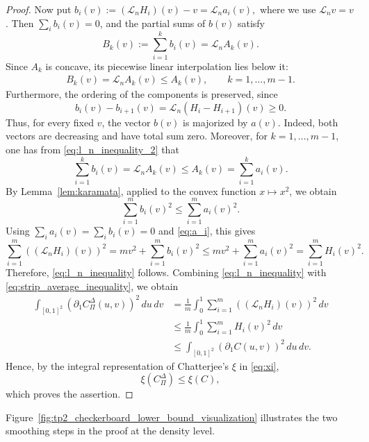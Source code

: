 \documentclass{article}
\theoremstyle{definition}
\begin{document}
\begin{proof}
    Now put
    \(
        b_i(v):=(\mathcal L_nH_i)(v)-v
        =
        \mathcal L_n a_i(v),
    \)
    where we use \(\mathcal L_n v=v\).
    Then \(\sum_i b_i(v)=0\), and the partial sums of \(b(v)\) satisfy
    \[
        B_k(v):=\sum_{i=1}^k b_i(v)
        =
        \mathcal L_n A_k(v).
    \]
    Since \(A_k\) is concave, its piecewise linear interpolation lies below it:
    \begin{align}\label{eq:l_n_inequality_2}
        B_k(v)=\mathcal L_n A_k(v)\le A_k(v),
        \qquad k=1,\dots,m-1.
    \end{align}
    Furthermore, the ordering of the components is preserved, since
    \[
        b_i(v)-b_{i+1}(v)
        =
        \mathcal L_n(H_i-H_{i+1})(v)\ge0.
    \]
    Thus, for every fixed \(v\), the vector \(b(v)\) is majorized by \(a(v)\).
    Indeed, both vectors are decreasing and have total sum zero.
    Moreover, for \(k=1,\ldots,m-1\), one has from \eqref{eq:l_n_inequality_2} that
    \[
        \sum_{i=1}^k b_i(v)
        =
        \mathcal L_n A_k(v)
        \le
        A_k(v)
        =
        \sum_{i=1}^k a_i(v).
    \]
    By Lemma~\ref{lem:karamata}, applied to the convex function \(x\mapsto x^2\), we obtain
    \[
        \sum_{i=1}^m b_i(v)^2
        \le
        \sum_{i=1}^m a_i(v)^2.
    \]
    Using \(\sum_i a_i(v)=\sum_i b_i(v)=0\) and \eqref{eq:a_i}, this gives
    \[
        \sum_{i=1}^m \left((\mathcal L_nH_i)(v)\right)^2
        =
        mv^2+\sum_{i=1}^m b_i(v)^2
        \le
        mv^2+\sum_{i=1}^m a_i(v)^2
        =
        \sum_{i=1}^m H_i(v)^2.
    \]
    Therefore, \eqref{eq:l_n_inequality} follows.
    Combining \eqref{eq:l_n_inequality} with \eqref{eq:strip_average_inequality}, we obtain
    \[
    \begin{aligned}
        \int_{[0,1]^2}
            \left(\partial_1 C^\Delta_\Pi(u,v)\right)^2
            \,du\,dv
        &=
        \frac1m\int_0^1
            \sum_{i=1}^m\left((\mathcal L_nH_i)(v)\right)^2\,dv \\
        &\le
        \frac1m\int_0^1
            \sum_{i=1}^mH_i(v)^2\,dv \\
        &\le
        \int_{[0,1]^2}
            \left(\partial_1 C(u,v)\right)^2
            \,du\,dv.
    \end{aligned}
    \]
    Hence, by the integral representation of Chatterjee's \(\xi\) in \eqref{eq:xi},
    \[
        \xi(C^\Delta_\Pi)\le \xi(C),
    \]
    which proves the assertion.
\end{proof}

Figure~\ref{fig:tp2_checkerboard_lower_bound_visualization} illustrates the two smoothing steps in the proof at the density level.
\end{document}
